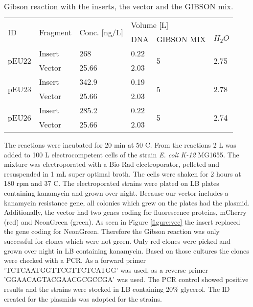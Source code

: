 \begin{table}[H]
	\begin{tabular}{|llllll|}
		\hline
		\multirow{2}{*}{ID}    & \multirow{2}{*}{Fragment} & \multirow{2}{*}{Conc. [ng/\textmu L]} & \multicolumn{3}{l|}{Volume [\textmu L]}           \\
		&                           &                                       & DNA  & GIBSON MIX         & $H_2O$                  \\ \hline
		\multirow{2}{*}{pEU22} & Insert                    & 268                                   & 0.22 & \multirow{2}{*}{5} & \multirow{2}{*}{2.75} \\
		& Vector                    & 25.66                                 & 2.03 &                    &                       \\ \hline
		\multirow{2}{*}{pEU23} & Insert                    & 342.9                                 & 0.19 & \multirow{2}{*}{5} & \multirow{2}{*}{2.78} \\
		& Vector                    & 25.66                                 & 2.03 &                    &                       \\ \hline
		\multirow{2}{*}{pEU26} & Insert                     & 285.2                                 & 0.22 & \multirow{2}{*}{5} & \multirow{2}{*}{2.74} \\
		& Vector                    & 25.66                                 & 2.03 &                    &                       \\ \hline
	\end{tabular}
	\caption{Gibson reaction with the inserts, the vector and the GIBSON mix.}
\end{table}
The reactions were incubated for 20 min at 50 \degree C. From the reactions 2 \textmu L was added to 100 \textmu L electrocompetent cells of the strain \textit{E. coli K-12} MG1655. The mixture was electroporated with a Bio-Rad electroporator, pelleted and resuspended in 1 mL super optimal broth. The cells were shaken for 2 hours at 180 rpm and 37 \degree C. The electroporated strains were plated on LB plates containing kanamycin  and grown over night. Because our vector includes a kanamycin resistance gene, all colonies which grew on the plates had the plasmid.  Additionally, the vector had two genes coding for fluorescence proteins, mCherry (red) and NeonGreen (green). As seen in Figure \ref{figure:vec} the insert replaced the gene coding for NeonGreen. Therefore the Gibson reaction was only successful for clones which were not green. Only red clones were picked and grown over night in LB containing kanamycin. Based on those cultures the clones were checked with a PCR. As a forward primer 'TCTCAATGGTTCGTTCTCATGG' was used, as a reverse primer 'GGAACAGTACGAACGCGCCGA' was used. The PCR control showed positive results and the strains were stocked in LB containing 20\% glycerol.
The ID created for the plasmids was adopted for the strains. 


